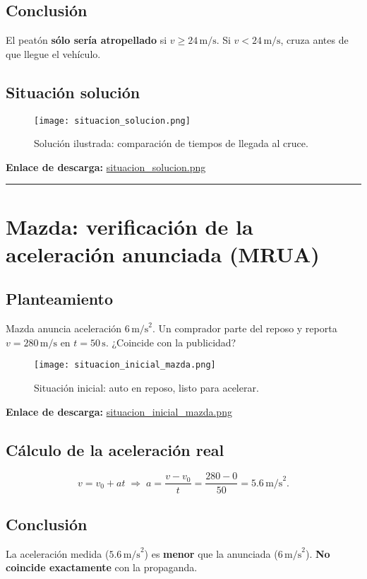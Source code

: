 \documentclass[14pt,letterpaper]{extarticle} %
\begin{document}
\subsection{Conclusión}
El peatón \textbf{sólo sería atropellado} si \(v\ge 24\,\text{m/s}\).
Si \(v<24\,\text{m/s}\), cruza antes de que llegue el vehículo.

\subsection{Situación solución}
\begin{figure}[h!]
  \centering
  \texttt{[image: situacion\_solucion.png]}
  \caption{Solución ilustrada: comparación de tiempos de llegada al cruce.}
\end{figure}
\noindent\textbf{Enlace de descarga:} \href{run:imagenes/situacion_solucion.png}{situacion\_solucion.png}

\bigskip
\hrule
\bigskip

\section{Mazda: verificación de la aceleración anunciada (MRUA)}

\subsection{Planteamiento}
Mazda anuncia aceleración \(6\,\text{m/s}^2\).
Un comprador parte del reposo y reporta \(v=280\,\text{m/s}\) en \(t=50\,\text{s}\).
¿Coincide con la publicidad?

\begin{figure}[h!]
  \centering
  \texttt{[image: situacion\_inicial\_mazda.png]}
  \caption{Situación inicial: auto en reposo, listo para acelerar.}
\end{figure}
\noindent\textbf{Enlace de descarga:} \href{run:imagenes/situacion_inicial_mazda.png}{situacion\_inicial\_mazda.png}

\subsection{Cálculo de la aceleración real}
\[
v = v_0 + a t \;\Rightarrow\; a=\frac{v-v_0}{t}
=\frac{280-0}{50}=5.6\,\text{m/s}^2.
\]

\subsection{Conclusión}
La aceleración medida (\(5.6\,\text{m/s}^2\)) es \textbf{menor} que la anunciada (\(6\,\text{m/s}^2\)).
\textbf{No coincide exactamente} con la propaganda.
\end{document}
